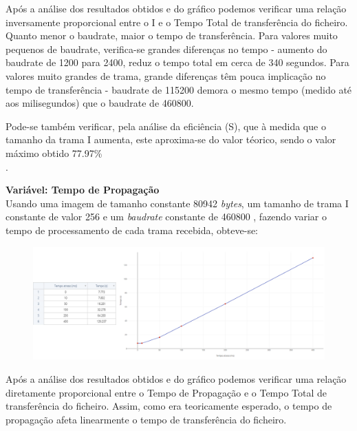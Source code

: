 \documentclass[a4paper, 11pt]{article}
\begin{document}
Após a análise dos resultados obtidos e do gráfico podemos verificar uma relação inversamente proporcional entre o  I e o Tempo Total de transferência do ficheiro. Quanto menor o baudrate, maior o tempo de transferência.  Para valores muito pequenos de baudrate, verifica-se grandes diferenças no tempo - aumento do baudrate de 1200 para 2400, reduz o tempo total em cerca de 340 segundos. Para valores muito grandes de trama, grande diferenças têm pouca implicação no tempo de transferência - baudrate de  115200 demora o mesmo tempo (medido até aos milisegundos) que o baudrate de 460800.

Pode-se também verificar, pela análise da eficiência (S), que à medida que o tamanho da trama I aumenta, este aproxima-se do valor téorico, sendo o valor máximo obtido 77.97\%\\.

\textbf{Variável: Tempo de Propagação}\\
Usando uma imagem de tamanho constante 80942 \textit{bytes}, um tamanho de trama I constante de valor 256 e um \textit{baudrate} constante de 460800 , fazendo variar o tempo de processamento de cada trama recebida, obteve-se:
\begin{figure}[h!]
\begin{center}
\includegraphics[scale=0.3]{images/TProp.png}
\end{center}
\end{figure}

Após a análise dos resultados obtidos e do gráfico podemos verificar uma relação diretamente proporcional entre o Tempo de Propagação e o Tempo Total de transferência do ficheiro. Assim, como era teoricamente esperado, o tempo de propagação afeta linearmente o tempo de transferência do ficheiro.
\end{document}
